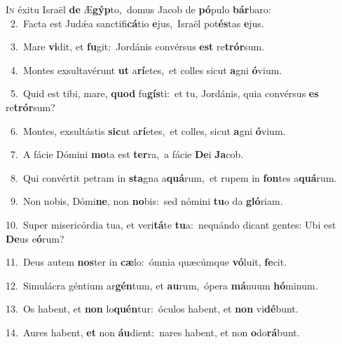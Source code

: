 \lettrine{\initial\textcolor{\initialcolor}{I}}{n} éxitu Israël \textbf{de} Æ\-\textbf{gýp}\-to,~\star domus Jacob de \textbf{pó}\-pulo \textbf{bár}\-baro:\\
{\numbfont\textcolor{\numbcolor}{~2.}}~Facta est Judǽa sanctifi\-\textbf{cá}\-tio \textbf{e}\-jus,~\star Israël pot\-\textbf{és}\-tas \textbf{e}\-jus.\par
{\numbfont\textcolor{\numbcolor}{~3.}}~Mare \textbf{vi}\-dit, et \textbf{fu}\-git:~\star Jordánis convérsus \textbf{est} re\-\textbf{trór}\-sum.\par
{\numbfont\textcolor{\numbcolor}{~4.}}~Montes exsultavérunt \textbf{ut} a\-\textbf{rí}\-etes,~\star et colles sicut \textbf{a}\-gni \textbf{ó}\-vium.\par
{\numbfont\textcolor{\numbcolor}{~5.}}~Quid est tibi, mare, \textbf{quod} fu\-\textbf{gís}\-ti:~\star et tu, Jordánis, quia convérsus \textbf{es} re\-\textbf{trór}\-sum?\par
{\numbfont\textcolor{\numbcolor}{~6.}}~Montes, exsultástis \textbf{sic}\-ut a\-\textbf{rí}\-etes,~\star et colles, sicut \textbf{a}\-gni \textbf{ó}\-vium.\par
{\numbfont\textcolor{\numbcolor}{~7.}}~A fácie Dómini \textbf{mo}\-ta est \textbf{ter}\-ra,~\star a fácie \textbf{De}\-i \textbf{Ja}\-cob.\par
{\numbfont\textcolor{\numbcolor}{~8.}}~Qui convértit petram in \textbf{sta}\-gna a\-\textbf{quá}\-rum,~\star et rupem in \textbf{fon}\-tes a\-\textbf{quá}\-rum.\par
{\numbfont\textcolor{\numbcolor}{~9.}}~Non nobis, Dómi\-\textbf{ne}\-, non \textbf{no}\-bis:~\star sed nómini \textbf{tu}\-o da \textbf{gló}\-riam.\par
{\numbfont\textcolor{\numbcolor}{10.}}~Super misericórdia tua, et veri\-\textbf{tá}\-te \textbf{tu}\-a:~\star nequándo dicant gentes: Ubi est \textbf{De}\-us e\-\textbf{ó}\-rum?\par
{\numbfont\textcolor{\numbcolor}{11.}}~Deus autem \textbf{nos}\-ter in \textbf{cæ}\-lo:~\star ómnia quæcúmque \textbf{vó}\-luit, \textbf{fe}\-cit.\par
{\numbfont\textcolor{\numbcolor}{12.}}~Simulácra géntium ar\-\textbf{gén}\-tum, et \textbf{au}\-rum,~\star ópera \textbf{má}\-nuum \textbf{hó}\-minum.\par
{\numbfont\textcolor{\numbcolor}{13.}}~Os habent, et \textbf{non} lo\-\textbf{quén}\-tur:~\star óculos habent, et \textbf{non} vi\-\textbf{dé}\-bunt.\par
{\numbfont\textcolor{\numbcolor}{14.}}~Aures habent, \textbf{et} non \textbf{áu}\-dient:~\star nares habent, et non \textbf{o}\-do\-\textbf{rá}\-bunt.\par
